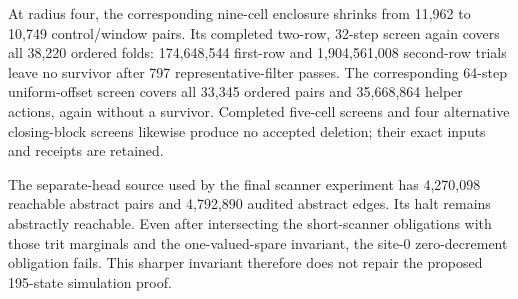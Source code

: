 At radius four, the corresponding nine-cell enclosure shrinks from 11,962 to 10,749 control/window pairs. Its completed two-row, 32-step screen again covers all 38,220 ordered folds: 174,648,544 first-row and 1,904,561,008 second-row trials leave no survivor after 797 representative-filter passes. The corresponding 64-step uniform-offset screen covers all 33,345 ordered pairs and 35,668,864 helper actions, again without a survivor. Completed five-cell screens and four alternative closing-block screens likewise produce no accepted deletion; their exact inputs and receipts are retained.

The separate-head source used by the final scanner experiment has 4,270,098 reachable abstract pairs and 4,792,890 audited abstract edges. Its halt remains abstractly reachable. Even after intersecting the short-scanner obligations with those trit marginals and the one-valued-spare invariant, the site-0 zero-decrement obligation fails. This sharper invariant therefore does not repair the proposed 195-state simulation proof.
